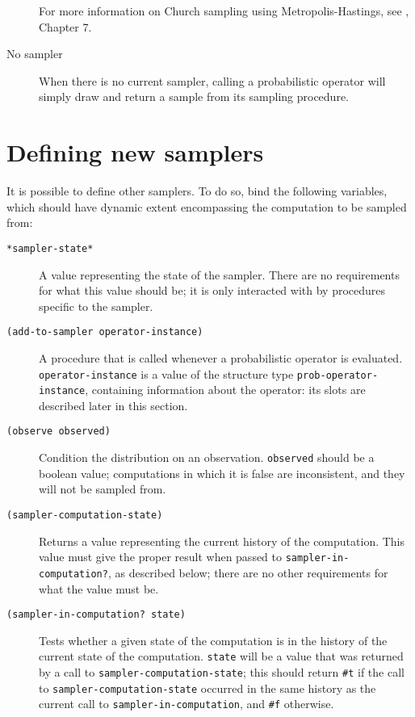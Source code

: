 \documentclass{article}
\begin{document}
\begin{description}
  For more information on Church sampling using Metropolis-Hastings,
  see \cite{goodman_probabilistic_????}, Chapter 7.

\item[No sampler] \hfill

  When there is no current sampler, calling a probabilistic operator
  will simply draw and return a sample from its sampling procedure.

\end{description}

\section{Defining new samplers}

It is possible to define other samplers. To do so, bind the following
variables, which should have dynamic extent encompassing the
computation to be sampled from:

\begin{description}
\item[\texttt{*sampler-state*}] \hfill

  A value representing the state of the sampler. There are no
  requirements for what this value should be; it is only interacted
  with by procedures specific to the sampler.

\item[\texttt{(add-to-sampler operator-instance)}] \hfill

  A procedure that is called whenever a probabilistic operator is
  evaluated. \texttt{operator-instance} is a value of the structure
  type \texttt{prob-operator-instance}, containing information about
  the operator: its slots are described later in this section.

\item[\texttt{(observe observed)}] \hfill

  Condition the distribution on an observation. \texttt{observed}
  should be a boolean value; computations in which it is false are
  inconsistent, and they will not be sampled from.

\item[\texttt{(sampler-computation-state)}] \hfill

  Returns a value representing the current history of the
  computation. This value must give the proper result when passed to
  \texttt{sampler-in-computation?}, as described below; there are no
  other requirements for what the value must be.

\item[\texttt{(sampler-in-computation? state)}] \hfill

  Tests whether a given state of the computation is in the history of
  the current state of the computation. \texttt{state} will be a value
  that was returned by a call to \texttt{sampler-computation-state};
  this should return \texttt{\#t} if the call to
  \texttt{sampler-computation-state} occurred in the same history as
  the current call to \texttt{sampler-in-computation}, and \texttt{\#f}
  otherwise.

\end{description}
\end{document}
